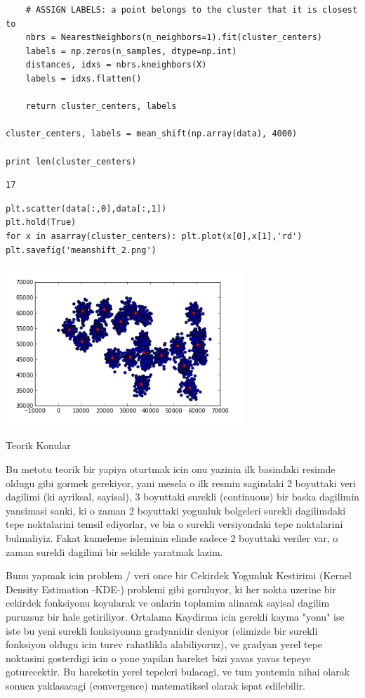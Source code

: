 \documentclass[12pt,fleqn]{article}\usepackage{../common}
\begin{document}
\begin{verbatim}
    # ASSIGN LABELS: a point belongs to the cluster that it is closest to
    nbrs = NearestNeighbors(n_neighbors=1).fit(cluster_centers)
    labels = np.zeros(n_samples, dtype=np.int)
    distances, idxs = nbrs.kneighbors(X)
    labels = idxs.flatten()
    
    return cluster_centers, labels

cluster_centers, labels = mean_shift(np.array(data), 4000)

print len(cluster_centers)
\end{verbatim}

\begin{verbatim}
17
\end{verbatim}

\begin{verbatim}
plt.scatter(data[:,0],data[:,1])
plt.hold(True)
for x in asarray(cluster_centers): plt.plot(x[0],x[1],'rd')
plt.savefig('meanshift_2.png')
\end{verbatim}

\includegraphics[height=6cm]{meanshift_2.png}

Teorik Konular

Bu metotu teorik bir yapiya oturtmak icin onu yazinin ilk basindaki
resimde oldugu gibi gormek gerekiyor, yani mesela o ilk resmin
sagindaki 2 boyuttaki veri dagilimi (ki ayriksal, sayisal), 3
boyuttaki surekli (continuous) bir baska dagilimin yansimasi sanki, ki
o zaman 2 boyuttaki yogunluk bolgeleri surekli dagilimdaki tepe
noktalarini temsil ediyorlar, ve biz o surekli versiyondaki tepe
noktalarini bulmaliyiz. Fakat kumeleme isleminin elinde sadece 2
boyuttaki veriler var, o zaman surekli dagilimi bir sekilde yaratmak
lazim.

Bunu yapmak icin problem / veri once bir Cekirdek Yogunluk Kestirimi
(Kernel Density Estimation -KDE-) problemi gibi goruluyor, ki her
nokta uzerine bir cekirdek fonksiyonu koyularak ve onlarin toplamim
alinarak sayisal dagilim puruzsuz bir hale getiriliyor. Ortalama
Kaydirma icin gerekli kayma "yonu" ise iste bu yeni surekli
fonksiyonun gradyanidir deniyor (elimizde bir surekli fonksiyon oldugu
icin turev rahatlikla alabiliyoruz), ve gradyan yerel tepe noktasini
gosterdigi icin o yone yapilan hareket bizi yavas yavas tepeye
goturecektir. Bu hareketin yerel tepeleri bulacagi, ve tum yontemin
nihai olarak sonuca yaklasacagi (convergence) matematiksel olarak
ispat edilebilir.
\end{document}
